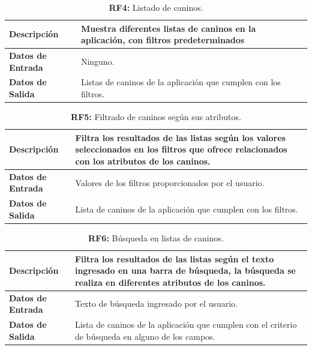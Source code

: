 \documentclass[a4paper, 12pt]{article}
\begin{document}
\begin{table}[H]
\captionsetup{list=no}%
\captionsetup{justification=raggedright,singlelinecheck=false}
\captionsetup{labelformat=empty}
\caption*{\textbf{RF4:} Listado de caninos.}
\label{tab:RF4}
	\begin{tabular}{|m{5cm}|m{10cm}|}
	\hline
	\textbf{Descripción} & Muestra diferentes listas de caninos en la aplicación, con filtros predeterminados \\ 
	\hline
	\textbf{Datos de Entrada} & Ninguno. \\ 
	\hline
	\textbf{Datos de Salida} & Listas de caninos de la aplicación que cumplen con los filtros. \\ 
	\hline
\end{tabular}
\end{table}

\begin{table}[H]
\captionsetup{list=no}%
\captionsetup{justification=raggedright,singlelinecheck=false}
\captionsetup{labelformat=empty}
\caption*{\textbf{RF5:} Filtrado de caninos según sus atributos.}
\label{tab:RF5}
	\begin{tabular}{|m{5cm}|m{10cm}|}
	\hline
	\textbf{Descripción} & Filtra los resultados de las listas según los valores seleccionados en los filtros que ofrece relacionados con los atributos de los caninos. \\ 
	\hline
	\textbf{Datos de Entrada} & Valores de los filtros proporcionados por el usuario. \\ 
	\hline
	\textbf{Datos de Salida} & Lista de caninos de la aplicación que cumplen con los filtros. \\ 
	\hline
\end{tabular}
\end{table}

\begin{table}[H]
\captionsetup{list=no}%
\captionsetup{justification=raggedright,singlelinecheck=false}
\captionsetup{labelformat=empty}
\caption*{\textbf{RF6:} Búsqueda en listas de caninos.}
\label{tab:RF6}
	\begin{tabular}{|m{5cm}|m{10cm}|}
	\hline
	\textbf{Descripción} & Filtra los resultados de las listas según el texto ingresado en una barra de búsqueda, la búsqueda se realiza en diferentes atributos de los caninos. \\ 
	\hline
	\textbf{Datos de Entrada} & Texto de búsqueda ingresado por el usuario. \\ 
	\hline
	\textbf{Datos de Salida} &  Lista de caninos de la aplicación que cumplen con el criterio de búsqueda en alguno de los campos. \\ 
	\hline
\end{tabular}
\end{table}
\end{document}
